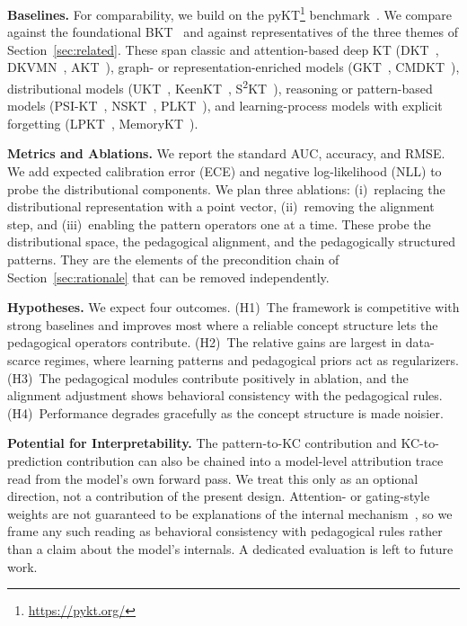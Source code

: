 \documentclass[conference]{IEEEtran}
\begin{document}
\textbf{Baselines.} For comparability, we build on the pyKT\footnote{\url{https://pykt.org/}} benchmark~\cite{liu2022pykt}. We compare against the foundational BKT~\cite{corbett1994kt} and against representatives of the three themes of Section~\ref{sec:related}. These span classic and attention-based deep KT (DKT~\cite{piech2015dkt}, DKVMN~\cite{zhang2017dkvmn}, AKT~\cite{ghosh2020akt}), graph- or representation-enriched models (GKT~\cite{nakagawa2019gkt}, CMDKT~\cite{xia2025cmdkt}), distributional models (UKT~\cite{chen2025ukt}, KeenKT~\cite{li2025keenkt}, S\textsuperscript{2}KT~\cite{wu2026sskt}), reasoning or pattern-based models (PSI-KT~\cite{zhou2024psikt}, NSKT~\cite{hooshyar2026nskt}, PLKT~\cite{wu2026plkt}), and learning-process models with explicit forgetting (LPKT~\cite{shen2021lpkt}, MemoryKT~\cite{lin2025memorykt}).

\textbf{Metrics and Ablations.} We report the standard AUC, accuracy, and RMSE. We add expected calibration error (ECE) and negative log-likelihood (NLL) to probe the distributional components. We plan three ablations: (i)~replacing the distributional representation with a point vector, (ii)~removing the alignment step, and (iii)~enabling the pattern operators one at a time. These probe the distributional space, the pedagogical alignment, and the pedagogically structured patterns. They are the elements of the precondition chain of Section~\ref{sec:rationale} that can be removed independently.

\textbf{Hypotheses.} We expect four outcomes. (H1)~The framework is competitive with strong baselines and improves most where a reliable concept structure lets the pedagogical operators contribute. (H2)~The relative gains are largest in data-scarce regimes, where learning patterns and pedagogical priors act as regularizers. (H3)~The pedagogical modules contribute positively in ablation, and the alignment adjustment shows behavioral consistency with the pedagogical rules. (H4)~Performance degrades gracefully as the concept structure is made noisier.

\smallskip\noindent\textbf{Potential for Interpretability.} The pattern-to-KC contribution and KC-to-prediction contribution can also be chained into a model-level attribution trace read from the model's own forward pass. We treat this only as an optional direction, not a contribution of the present design. Attention- or gating-style weights are not guaranteed to be explanations of the internal mechanism~\cite{jain2019attention,wiegreffe2019attention}, so we frame any such reading as behavioral consistency with pedagogical rules rather than a claim about the model's internals. A dedicated evaluation is left to future work.
\end{document}
